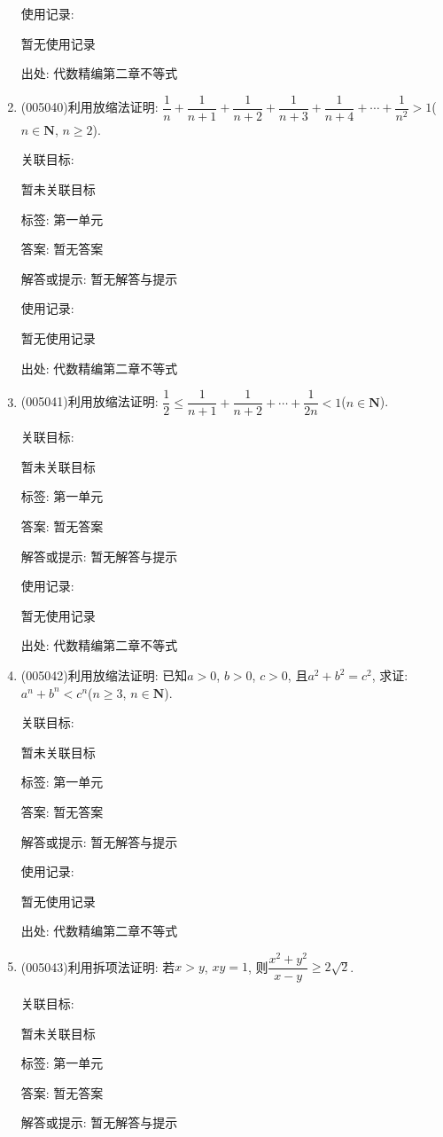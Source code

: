 \documentclass[10pt,a4paper]{article}
\begin{document}
\begin{enumerate}[1.]
使用记录:

暂无使用记录


出处: 代数精编第二章不等式
\item { (005040)}利用放缩法证明: $\dfrac 1n+\dfrac 1{n+1}+\dfrac 1{n+2}+\dfrac 1{n+3}+\dfrac 1{n+4}+\cdots +\dfrac 1{n^2}>1$($n\in \mathbf{N}$, $n\ge 2$).


关联目标:

暂未关联目标



标签: 第一单元

答案: 暂无答案

解答或提示: 暂无解答与提示

使用记录:

暂无使用记录


出处: 代数精编第二章不等式
\item { (005041)}利用放缩法证明: $\dfrac 12\le \dfrac 1{n+1}+\dfrac 1{n+2}+\cdots +\dfrac 1{2n}<1$($n\in \mathbf{N}$).


关联目标:

暂未关联目标



标签: 第一单元

答案: 暂无答案

解答或提示: 暂无解答与提示

使用记录:

暂无使用记录


出处: 代数精编第二章不等式
\item { (005042)}利用放缩法证明: 已知$a>0$, $b>0$, $c>0$, 且$a^2+b^2=c^2$, 求证: $a^n+b^n<c^n$($n\ge 3$, $n\in \mathbf{N}$).


关联目标:

暂未关联目标



标签: 第一单元

答案: 暂无答案

解答或提示: 暂无解答与提示

使用记录:

暂无使用记录


出处: 代数精编第二章不等式
\item { (005043)}利用拆项法证明: 若$x>y$, $xy=1$, 则$\dfrac{x^2+y^2}{x-y}\ge 2\sqrt 2$.


关联目标:

暂未关联目标



标签: 第一单元

答案: 暂无答案

解答或提示: 暂无解答与提示


\end{enumerate}
\end{document}
